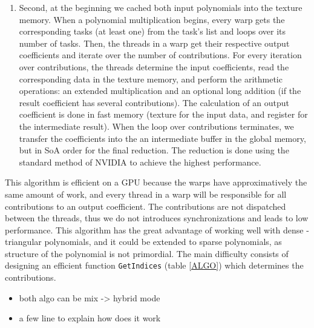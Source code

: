 \documentclass[oribibl]{llncs2e/llncs}
\begin{document}
\begin{enumerate}
\item  Second, at the beginning we  cached both input polynomials into the texture memory. 
When a polynomial multiplication begins,  every warp gets the corresponding tasks (at least one) from the task's list and loops over its number of tasks. Then,
the threads in a warp get their respective output coefficients and iterate over the number of  contributions.
For every iteration over contributions, the threads determine the input coefficients, read the corresponding data in the texture memory, and perform the arithmetic operations: an extended multiplication and an optional long addition (if the result coefficient has several contributions). The calculation of an output coefficient  is  done in fast memory (texture for the input data, and register for the intermediate result). 
When the loop over contributions terminates,  we transfer the coefficients into the an intermediate buffer in the global memory, but in SoA  order for the final reduction. 
The reduction is done using the standard method of NVIDIA \cite{CUDAReduction} to achieve the highest performance.




\end{enumerate}


This algorithm is efficient on a GPU because the warps have approximatively the same amount of work,  and every thread in a warp will be responsible for all contributions to an output coefficient.
The contributions are not dispatched between the threads, thus we do not  introduces   synchronizations and leads to low performance. 
This  algorithm has the great advantage of working well with dense - triangular polynomials, and it could be extended to sparse polynomials, as structure of the polynomial is not primordial.
The main difficulty consists  of designing an efficient function \texttt{GetIndices} (table \ref{ALGO}) which determines the contributions.

\begin{itemize}
\item both algo can be mix -> hybrid mode
\item a few line to explain how does it work
\end{itemize}
\end{document}
